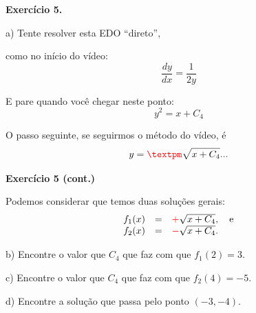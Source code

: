 \documentclass[oneside,12pt]{article}
\begin{document}
{\bf Exercício 5.}

a) Tente resolver esta EDO ``direto'',

como no início do vídeo:
%
$$\frac{dy}{dx} = \frac{1}{2y}$$

E pare quando você chegar neste ponto:
%
$$y^2 = x + C_4$$

O passo seguinte, se seguirmos o método do vídeo, é
%
$$y = \ColorRed{±}\sqrt{x + C_4}...$$

\newpage

{\bf Exercício 5 (cont.)}

Podemos considerar que temos duas soluções gerais:
%
$$\begin{array}{rcl}
  f_1(x) &=& \ColorRed{+}\sqrt{x + C_4}, \quad \text{e} \\
  f_2(x) &=& \ColorRed{-}\sqrt{x + C_4}. \\
  \end{array}
$$

b) Encontre o valor que $C_4$ que faz com que $f_1(2)=3$.

c) Encontre o valor que $C_4$ que faz com que $f_2(4)=-5$.

d) Encontre a solução que passa pelo ponto $(-3,-4)$.



\end{document}
